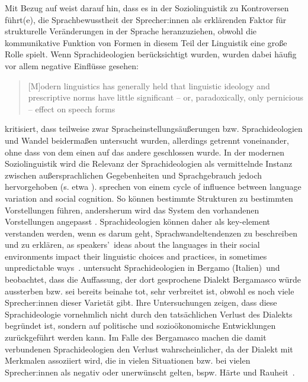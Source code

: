 Mit Bezug auf \citet{Errington.1985} weist \citet[12--13]{Woolard1998} darauf hin, dass es in der Soziolinguistik zu Kontroversen f{\"u}hrt(e), die Sprachbewusstheit der Sprecher:innen als erkl{\"a}renden Faktor f{\"u}r strukturelle Ver{\"a}nderungen in der Sprache heranzuziehen, obwohl die kommunikative Funktion von Formen in diesem Teil der Linguistik eine gro{\ss}e Rolle spielt. 
Wenn Sprachideologien berücksichtigt wurden, wurden dabei häufig vor allem negative Einflüsse gesehen:
\begin{quote}[M]odern linguistics has generally held that linguistic ideology and prescriptive norms have little significant -- or, paradoxically, only pernicious -- effect on speech forms~\citep[69]{Woolard1994}\end{quote}
\citet[161]{Milroy2004} kritisiert, dass teilweise zwar %
Spracheinstellungsäußerungen %
bzw. {Sprach\-ideo\-lo\-gien} und Wandel beidermaßen untersucht wurden, allerdings getrennt voneinander, ohne dass von dem einen auf das andere geschlossen wurde. 
In der modernen Soziolinguistik wird die Relevanz der Sprachideologien als vermittelnde Instanz zwischen außersprachlichen Gegebenheiten und Sprachgebrauch jedoch hervorgehoben (s. etwa \cites{Silverstein.1985}{Irvine2000}{Woolard2008}{Eckert2012}). 
\citet[7]{Garrett2003} sprechen von einem {\glqq}cycle of influence between language variation and social cognition{\grqq}. 
So können bestimmte Strukturen zu bestimmten Vorstellungen f{\"u}hren, andersherum wird das {Sys\-tem} den vorhandenen Vorstellungen angepasst \citep[s.][12]{Woolard1998}.
Sprachideologien k{\"o}nnen daher als \glqq key-element\grqq{} verstanden werden, wenn es darum geht, Sprachwandeltendenzen zu beschreiben und zu erkl{\"a}ren, \glqq as speakers'~ideas about the languages in their social environments impact their linguistic choices and practices, in sometimes unpredictable ways\grqq{}~\citep[47]{Cavanaugh.2013}. 
\citet{Cavanaugh.2013} untersucht Sprachideologien in Bergamo (Italien)~und beobachtet, dass die Auffassung, der dort gesprochene Dialekt Bergamasco w{\"u}rde aussterben bzw. sei bereits beinahe tot, sehr verbreitet ist, obwohl es noch viele Sprecher:innen dieser Variet{\"a}t gibt. 
Ihre Untersuchungen zeigen, dass diese Sprachideologie vornehmlich nicht durch den tats{\"a}chlichen Verlust des Dialekts begr{\"u}ndet ist, sondern auf politische und sozio{\"o}konomische Entwicklungen zur{\"u}ckgef{\"u}hrt werden kann. 
Im Falle des Bergamasco machen die damit verbundenen Sprachideologien den Verlust wahrscheinlicher, da der Dialekt mit Merkmalen assoziiert wird, die in vielen Situationen bzw. bei vielen Sprecher:innen als negativ oder unerw{\"u}nscht gelten, bspw. H{\"a}rte und Rauheit~\citep[s.][51]{Cavanaugh.2013}.

